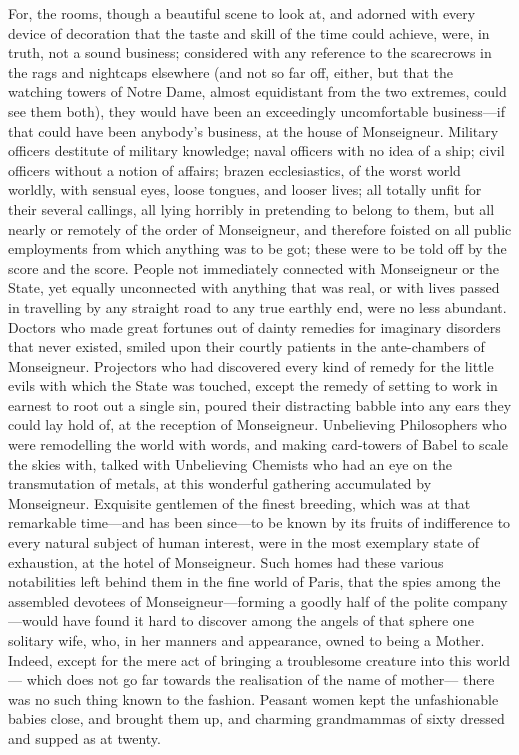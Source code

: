For, the rooms, though a beautiful scene to look at, and adorned with
every device of decoration that the taste and skill of the time could
achieve, were, in truth, not a sound business; considered with any
reference to the scarecrows in the rags and nightcaps elsewhere
(and not so far off, either, but that the watching towers of Notre
Dame, almost equidistant from the two extremes, could see them both),
they would have been an exceedingly uncomfortable business---if that
could have been anybody's business, at the house of Monseigneur.
Military officers destitute of military knowledge; naval officers
with no idea of a ship; civil officers without a notion of affairs;
brazen ecclesiastics, of the worst world worldly, with sensual eyes,
loose tongues, and looser lives; all totally unfit for their several
callings, all lying horribly in pretending to belong to them, but all
nearly or remotely of the order of Monseigneur, and therefore foisted
on all public employments from which anything was to be got; these were
to be told off by the score and the score.  People not immediately
connected with Monseigneur or the State, yet equally unconnected with
anything that was real, or with lives passed in travelling by any
straight road to any true earthly end, were no less abundant.
Doctors who made great fortunes out of dainty remedies for imaginary
disorders that never existed, smiled upon their courtly patients in
the ante-chambers of Monseigneur.  Projectors who had discovered
every kind of remedy for the little evils with which the State was
touched, except the remedy of setting to work in earnest to root out
a single sin, poured their distracting babble into any ears they
could lay hold of, at the reception of Monseigneur.  Unbelieving
Philosophers who were remodelling the world with words, and making
card-towers of Babel to scale the skies with, talked with Unbelieving
Chemists who had an eye on the transmutation of metals, at this
wonderful gathering accumulated by Monseigneur.  Exquisite gentlemen
of the finest breeding, which was at that remarkable time---and has
been since---to be known by its fruits of indifference to every
natural subject of human interest, were in the most exemplary state
of exhaustion, at the hotel of Monseigneur.  Such homes had these
various notabilities left behind them in the fine world of Paris,
that the spies among the assembled devotees of Monseigneur---forming a
goodly half of the polite company---would have found it hard to
discover among the angels of that sphere one solitary wife, who, in
her manners and appearance, owned to being a Mother.  Indeed, except
for the mere act of bringing a troublesome creature into this world---%
which does not go far towards the realisation of the name of mother---%
there was no such thing known to the fashion.  Peasant women kept the
unfashionable babies close, and brought them up, and charming grandmammas
of sixty dressed and supped as at twenty.

